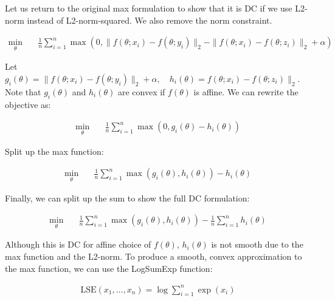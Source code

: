 \documentclass[11pt]{article}
\begin{document}
Let us return to the original max formulation to show that it is DC if we use L2-norm instead of L2-norm-squared. We also remove the norm constraint.

\begin{equation}
\begin{aligned}
    \min_{\theta} \quad & \frac{1}{n} \sum_{i=1}^{n} \max(0, \| f(\theta; x_i) - f(\theta; y_i)\|_2 - \| f(\theta; x_i) - f(\theta; z_i)\|_2 + \alpha)
\end{aligned}
\end{equation}

Let $g_i(\theta) = \| f(\theta; x_i) - f(\theta; y_i)\|_2 + \alpha, \quad h_i(\theta) = f(\theta; x_i) - f(\theta; z_i)\|_2$. Note that $g_i(\theta)$ and $h_i(\theta)$ are convex if $f(\theta)$ is affine. We can rewrite the objective as:

\begin{equation}
\begin{aligned}
    \min_{\theta} \quad & \frac{1}{n} \sum_{i=1}^{n} \max(0, g_i(\theta) - h_i(\theta))
\end{aligned}
\end{equation}

Split up the max function:

\begin{equation}
\begin{aligned}
    \min_{\theta} \quad & \frac{1}{n} \sum_{i=1}^{n} \max(g_i(\theta), h_i(\theta)) - h_i(\theta)
\end{aligned}
\end{equation}

Finally, we can split up the sum to show the full DC formulation:

\begin{equation}
\begin{aligned}
    \min_{\theta} \quad & \frac{1}{n} \sum_{i=1}^{n} \max(g_i(\theta), h_i(\theta)) - \frac{1}{n} \sum_{i=1}^{n} h_i(\theta)
\end{aligned}
\end{equation}

Although this is DC for affine choice of $f(\theta)$, $h_i(\theta)$ is not smooth due to the max function and the L2-norm. To produce a smooth, convex approximation to the max function, we can use the LogSumExp function:

\begin{equation}
\begin{aligned}
\textrm{LSE}(x_1, ..., x_n) = \log\sum_{i=1}^{n} \exp(x_i)
\end{aligned}
\end{equation}
\end{document}
